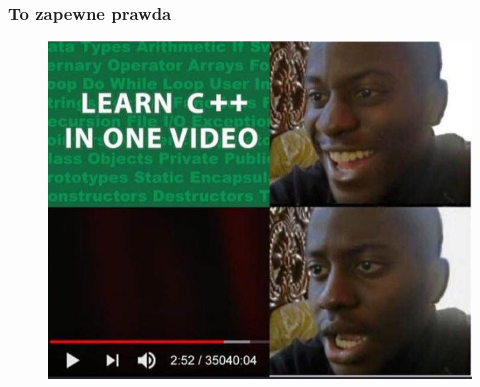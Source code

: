 \documentclass[10pt,t]{beamer}
\begin{document}
\begin{frame}
  \frametitle{To zapewne prawda}


  \begin{figure}

    \centering


    \includegraphics[scale=0.4]
    {./PresentationsPictures/Learning-Cpp.jpg}

  \end{figure}

\end{frame}










\end{document}

